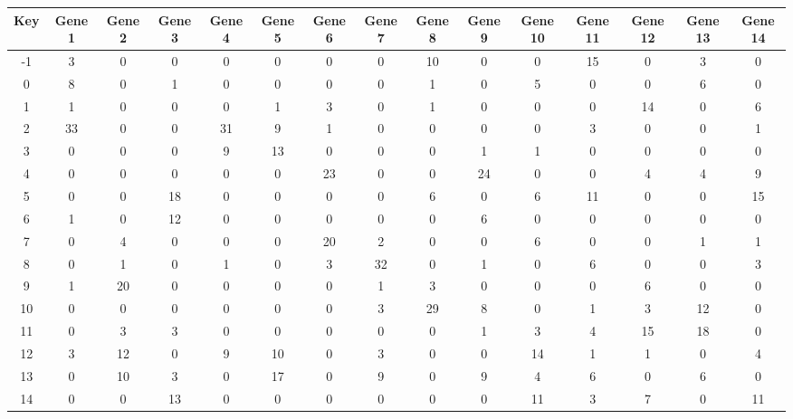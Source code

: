 \begin{tabular}{|c|c|c|c|c|c|c|c|c|c|c|c|c|c|c|}
\hline
Key & Gene 1 & Gene 2 & Gene 3 & Gene 4 & Gene 5 & Gene 6 & Gene 7 & Gene 8 & Gene 9 & Gene 10 & Gene 11 & Gene 12 & Gene 13 & Gene 14 \\
\hline
-1 & 3 & 0 & 0 & 0 & 0 & 0 & 0 & 10 & 0 & 0 & 15 & 0 & 3 & 0 \\
0 & 8 & 0 & 1 & 0 & 0 & 0 & 0 & 1 & 0 & 5 & 0 & 0 & 6 & 0 \\
1 & 1 & 0 & 0 & 0 & 1 & 3 & 0 & 1 & 0 & 0 & 0 & 14 & 0 & 6 \\
2 & 33 & 0 & 0 & 31 & 9 & 1 & 0 & 0 & 0 & 0 & 3 & 0 & 0 & 1 \\
3 & 0 & 0 & 0 & 9 & 13 & 0 & 0 & 0 & 1 & 1 & 0 & 0 & 0 & 0 \\
4 & 0 & 0 & 0 & 0 & 0 & 23 & 0 & 0 & 24 & 0 & 0 & 4 & 4 & 9 \\
5 & 0 & 0 & 18 & 0 & 0 & 0 & 0 & 6 & 0 & 6 & 11 & 0 & 0 & 15 \\
6 & 1 & 0 & 12 & 0 & 0 & 0 & 0 & 0 & 6 & 0 & 0 & 0 & 0 & 0 \\
7 & 0 & 4 & 0 & 0 & 0 & 20 & 2 & 0 & 0 & 6 & 0 & 0 & 1 & 1 \\
8 & 0 & 1 & 0 & 1 & 0 & 3 & 32 & 0 & 1 & 0 & 6 & 0 & 0 & 3 \\
9 & 1 & 20 & 0 & 0 & 0 & 0 & 1 & 3 & 0 & 0 & 0 & 6 & 0 & 0 \\
10 & 0 & 0 & 0 & 0 & 0 & 0 & 3 & 29 & 8 & 0 & 1 & 3 & 12 & 0 \\
11 & 0 & 3 & 3 & 0 & 0 & 0 & 0 & 0 & 1 & 3 & 4 & 15 & 18 & 0 \\
12 & 3 & 12 & 0 & 9 & 10 & 0 & 3 & 0 & 0 & 14 & 1 & 1 & 0 & 4 \\
13 & 0 & 10 & 3 & 0 & 17 & 0 & 9 & 0 & 9 & 4 & 6 & 0 & 6 & 0 \\
14 & 0 & 0 & 13 & 0 & 0 & 0 & 0 & 0 & 0 & 11 & 3 & 7 & 0 & 11 \\
\hline
\end{tabular}